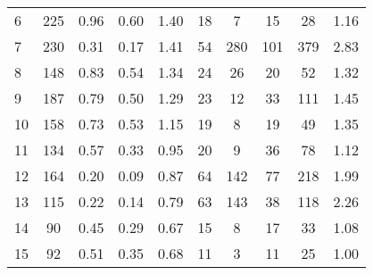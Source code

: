 \documentclass[usenatbib]{mn2e}
\begin{document}
{\begin{table*}
\begin{center}
\begin{tabular}{lccccccccc}
 6 &      225 &                             0.96 &                             0.60 &                             1.40 &              18 &               7 &                                 15 &                              28 &       1.16 \\
 7 &      230 &                             0.31 &                             0.17 &                             1.41 &              54 &             280 &                                101 &                             379 &       2.83 \\
 8 &      148 &                             0.83 &                             0.54 &                             1.34 &              24 &              26 &                                 20 &                              52 &       1.32 \\
 9 &      187 &                             0.79 &                             0.50 &                             1.29 &              23 &              12 &                                 33 &                             111 &       1.45 \\
10 &      158 &                             0.73 &                             0.53 &                             1.15 &              19 &               8 &                                 19 &                              49 &       1.35 \\
11 &      134 &                             0.57 &                             0.33 &                             0.95 &              20 &               9 &                                 36 &                              78 &       1.12 \\
12 &      164 &                             0.20 &                             0.09 &                             0.87 &              64 &             142 &                                 77 &                             218 &       1.99 \\
13 &      115 &                             0.22 &                             0.14 &                             0.79 &              63 &             143 &                                 38 &                             118 &       2.26 \\
14 &       90 &                             0.45 &                             0.29 &                             0.67 &              15 &               8 &                                 17 &                              33 &       1.08 \\
15 &       92 &                             0.51 &                             0.35 &                             0.68 &              11 &               3 &                                 11 &                              25 &       1.00 \\

\end{tabular}
\end{center}
\end{table*}}
\end{document}
